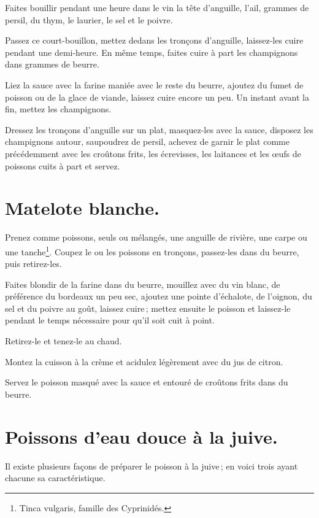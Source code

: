 Faites bouillir pendant une heure dans le vin la tête d'anguille, l'ail,
{\mmm} grammes de persil, du thym, le laurier, le sel et le poivre.

Passez ce court-bouillon, mettez dedans les tronçons d'anguille, laissez-les
cuire pendant une demi-heure. En même temps, faites cuire à part les
champignons dans {\mmm} grammes de beurre.

Liez la sauce avec la farine maniée avec le reste du beurre, ajoutez du fumet
de poisson ou de la glace de viande, laissez cuire encore un peu. Un instant
avant la fin, mettez les champignons.

Dressez les tronçons d'anguille sur un plat, masquez-les avec la sauce,
disposez les champignons autour, saupoudrez de persil, achevez de garnir le
plat comme précédemment avec les croûtons frits, les écrevisses, les laitances
et les œufs de poissons cuits à part et servez.

\section*{\centering Matelote blanche.}

Prenez comme poissons, seuls ou mélangés, une anguille de rivière, une carpe ou
une tanche\footnote{Tinca vulgaris, famille des Cyprinidés.}. Coupez le ou les
poissons en tronçons, passez-les dans du beurre, puis retirez-les.

Faites blondir de la farine dans du beurre, mouillez avec du vin blanc, de
préférence du bordeaux un peu sec, ajoutez une pointe d'échalote, de l'oignon,
du sel et du poivre au goût, laissez cuire ; mettez ensuite le poisson et
laissez-le pendant le temps nécessaire pour qu'il soit cuit à point.

Retirez-le et tenez-le au chaud.

Montez la cuisson à la crème et acidulez légèrement avec du jus de citron.

Servez le poisson masqué avec la sauce et entouré de croûtons frits dans du
beurre.

\section*{\centering Poissons d'eau douce à la juive.}

Il existe plusieurs façons de préparer le poisson à la juive ; en voici trois
ayant chacune sa caractéristique.

